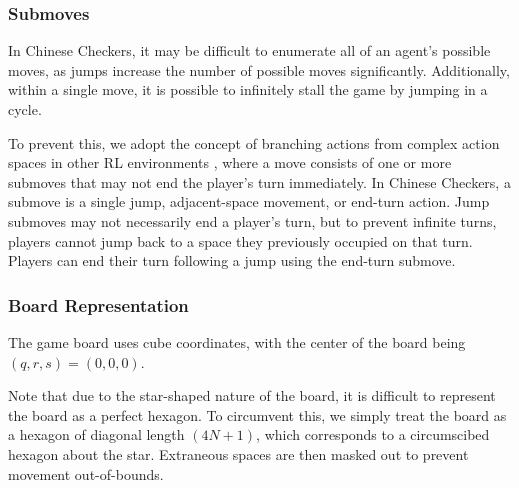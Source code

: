 \documentclass[12pt, a4paper, twocolumn]{article}
\begin{document}
\subsubsection{Submoves}

In Chinese Checkers, it may be difficult to enumerate all of an agent's possible moves, as jumps increase the number of possible moves significantly. Additionally, within a single move, it is possible to infinitely stall the game by jumping in a cycle.

To prevent this, we adopt the concept of branching actions from complex action spaces in other RL environments \cite{BranchingActions}, where a move consists of one or more submoves that may not end the player's turn immediately. In Chinese Checkers, a submove is a single jump, adjacent-space movement, or end-turn action. Jump submoves may not necessarily end a player's turn, but to prevent infinite turns, players cannot jump back to a space they previously occupied on that turn. Players can end their turn following a jump using the end-turn submove.

\subsubsection{Board Representation}
The game board uses cube coordinates, with the center of the board being $(q, r, s) = (0, 0, 0)$.

Note that due to the star-shaped nature of the board, it is difficult to represent the board as a perfect hexagon. To circumvent this, we simply treat the board as a hexagon of diagonal length $(4N+1)$, which corresponds to a circumscibed hexagon about the star. Extraneous spaces are then masked out to prevent movement out-of-bounds. 

\end{document}
